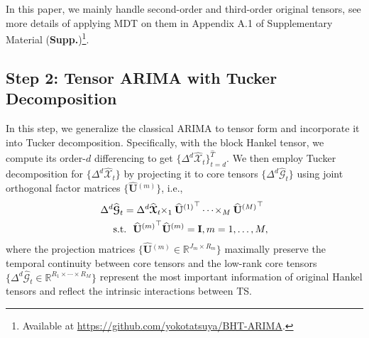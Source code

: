 \documentclass[letterpaper]{article} %
\numberwithin{theorem}{section}
\newcommand{\ten}[1]{ \boldsymbol{\mathcal #1}}
\newcommand{\bbR}[1]{\mathbb{R}^{#1}}
\begin{document}
In this paper, we mainly handle  second-order and third-order original tensors, see more details of applying MDT on them in Appendix A.1 of Supplementary Material (\textbf{Supp.})\footnote{Available at \url{https://github.com/yokotatsuya/BHT-ARIMA}.}. 







\subsection{Step 2: Tensor ARIMA with Tucker Decomposition}
In this step,  we generalize the classical  ARIMA to tensor form and  incorporate it into  Tucker decomposition.  Specifically, with the block Hankel tensor,  we  compute its order-$d$ differencing   to  get $\{ \Delta^d  \widehat{\ten{X}}_t\}_{t=d}^{\widehat{T}}$.
We then  employ  Tucker decomposition for    $\{ \Delta^d  \widehat{\ten{X}}_t\}$ by  projecting  it  to  core tensors  $ \{ \Delta^d  \widehat{\ten{G}}_t\}$ using  joint orthogonal factor matrices $ \{\widehat{\mathbf U}{^{(m)}}\}$, i.e.,  
\begin{equation}
\begin{aligned}\label{eq:Tucker_com0} 
\small
\Delta^d & {\widehat{\ten{G}}_t}      =  \Delta^d  {\widehat{\ten{X}}_t} \hspace{-0.1cm} \times_1   \widehat{\mathbf U}{^{(1)}}^\top \cdots \hspace{-0.05cm}  \times_M \widehat{\mathbf U}{^{(M)}}^\top   \\& \text{s.t.}  \ \ \widehat{ \mathbf U}{^{(m)}}^\top \widehat{ \mathbf U}{^{(m)}} = \mathbf I, m=1,\ldots, M, 
\end{aligned}
\end{equation}
where the projection matrices $ \{\widehat{\mathbf U}{^{(m)}} \in \bbR{J_m \times R_m} \}$  maximally preserve the temporal continuity between core tensors and the low-rank core tensors $ \{{ \Delta^d  \widehat{\ten{G}}_t}\in \bbR{R_1 \times \cdots \times R_M}\}$  represent the most important information of original Hankel tensors and reflect the intrinsic interactions between  TS.
\end{document}
